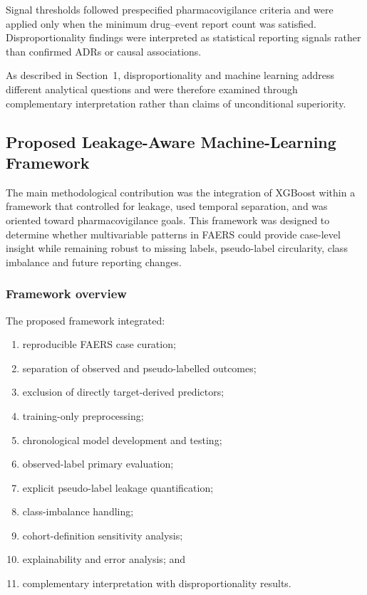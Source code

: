 \documentclass[10pt]{article}
\begin{document}
Signal thresholds followed prespecified pharmacovigilance criteria and were applied only when the minimum drug--event report count was satisfied. Disproportionality findings were interpreted as statistical reporting signals rather than confirmed ADRs or causal associations.

As described in Section~1, disproportionality and machine learning address different analytical questions and were therefore examined through complementary interpretation rather than claims of unconditional superiority.

\subsection{Proposed Leakage-Aware Machine-Learning Framework}
The main methodological contribution was the integration of XGBoost within a framework that controlled for leakage, used temporal separation, and was oriented toward pharmacovigilance goals. This framework was designed to determine whether multivariable patterns in FAERS could provide case-level insight while remaining robust to missing labels, pseudo-label circularity, class imbalance and future reporting changes.

\subsubsection{Framework overview}
The proposed framework integrated:
\begin{enumerate}
\item reproducible FAERS case curation;
\item separation of observed and pseudo-labelled outcomes;
\item exclusion of directly target-derived predictors;
\item training-only preprocessing;
\item chronological model development and testing;
\item observed-label primary evaluation;
\item explicit pseudo-label leakage quantification;
\item class-imbalance handling;
\item cohort-definition sensitivity analysis;
\item explainability and error analysis; and
\item complementary interpretation with disproportionality results.
\end{enumerate}
\end{document}
